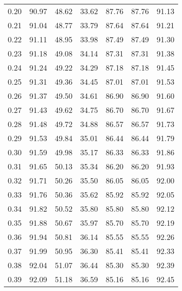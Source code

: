 \begin{tabular}{|c|c|c|c|c|c|c|}
      0.20 &     90.97 &     48.62 &      33.62 &   87.76 &      87.76 &         91.13 \\
      0.21 &     91.04 &     48.77 &      33.79 &   87.64 &      87.64 &         91.21 \\
      0.22 &     91.11 &     48.95 &      33.98 &   87.49 &      87.49 &         91.30 \\
      0.23 &     91.18 &     49.08 &      34.14 &   87.31 &      87.31 &         91.38 \\
      0.24 &     91.24 &     49.22 &      34.29 &   87.18 &      87.18 &         91.45 \\
      0.25 &     91.31 &     49.36 &      34.45 &   87.01 &      87.01 &         91.53 \\
      0.26 &     91.37 &     49.50 &      34.61 &   86.90 &      86.90 &         91.60 \\
      0.27 &     91.43 &     49.62 &      34.75 &   86.70 &      86.70 &         91.67 \\
      0.28 &     91.48 &     49.72 &      34.88 &   86.57 &      86.57 &         91.73 \\
      0.29 &     91.53 &     49.84 &      35.01 &   86.44 &      86.44 &         91.79 \\
      0.30 &     91.59 &     49.98 &      35.17 &   86.33 &      86.33 &         91.86 \\
      0.31 &     91.65 &     50.13 &      35.34 &   86.20 &      86.20 &         91.93 \\
      0.32 &     91.71 &     50.26 &      35.50 &   86.05 &      86.05 &         92.00 \\
      0.33 &     91.76 &     50.36 &      35.62 &   85.92 &      85.92 &         92.05 \\
      0.34 &     91.82 &     50.52 &      35.80 &   85.80 &      85.80 &         92.12 \\
      0.35 &     91.88 &     50.67 &      35.97 &   85.70 &      85.70 &         92.19 \\
      0.36 &     91.94 &     50.81 &      36.14 &   85.55 &      85.55 &         92.26 \\
      0.37 &     91.99 &     50.95 &      36.30 &   85.41 &      85.41 &         92.33 \\
      0.38 &     92.04 &     51.07 &      36.44 &   85.30 &      85.30 &         92.39 \\
      0.39 &     92.09 &     51.18 &      36.59 &   85.16 &      85.16 &         92.45 \\

\end{tabular}
